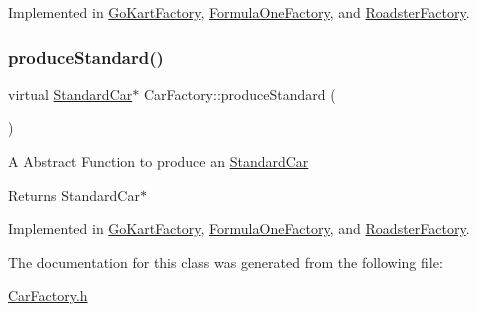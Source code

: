 Implemented in \mbox{\hyperlink{class_go_kart_factory_a29dc434be1a5447b0ab321f9d9c0fb46}{Go\+Kart\+Factory}}, \mbox{\hyperlink{class_formula_one_factory_a33707e14c22e124b204f268cca3ad21a}{Formula\+One\+Factory}}, and \mbox{\hyperlink{class_roadster_factory_a0de9b71d1c2c6e2ffd39a6c8a43dfc57}{Roadster\+Factory}}.

\mbox{\label{class_car_factory_a34ffd5237b689fa31a9a593796d296f2}} 
\subsubsection{\texorpdfstring{produce\+Standard()}{produceStandard()}}
{\footnotesize\ttfamily virtual \mbox{\hyperlink{class_standard_car}{Standard\+Car}}$\ast$ Car\+Factory\+::produce\+Standard (\begin{DoxyParamCaption}{ }\end{DoxyParamCaption})\hspace{0.3cm}{\ttfamily [pure virtual]}}

A Abstract Function to produce an \mbox{\hyperlink{class_standard_car}{Standard\+Car}} \begin{DoxyReturn}{Returns}
Standard\+Car$\ast$ 
\end{DoxyReturn}


Implemented in \mbox{\hyperlink{class_go_kart_factory_abd7bc7f04d3515169d2edb6ff51996ba}{Go\+Kart\+Factory}}, \mbox{\hyperlink{class_formula_one_factory_ad58bf42a7a84218f3b022b3b3f6859d4}{Formula\+One\+Factory}}, and \mbox{\hyperlink{class_roadster_factory_a127974ae0ff6bdabdf628b920ee2e518}{Roadster\+Factory}}.



The documentation for this class was generated from the following file\+:\begin{DoxyCompactItemize}
\item 
\mbox{\hyperlink{_car_factory_8h}{Car\+Factory.\+h}}\end{DoxyCompactItemize}
